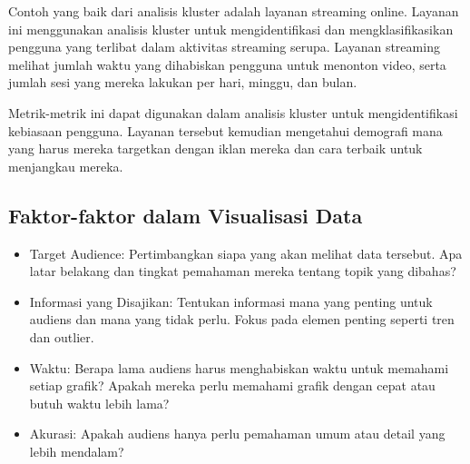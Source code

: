 \documentclass{article}
\begin{document}
\begin{itemize}
          Contoh yang baik dari analisis kluster adalah layanan streaming online. Layanan ini menggunakan analisis kluster untuk mengidentifikasi dan mengklasifikasikan pengguna yang terlibat dalam aktivitas streaming serupa. Layanan streaming melihat jumlah waktu yang dihabiskan pengguna untuk menonton video, serta jumlah sesi yang mereka lakukan per hari, minggu, dan bulan.

          Metrik-metrik ini dapat digunakan dalam analisis kluster untuk mengidentifikasi kebiasaan pengguna. Layanan tersebut kemudian mengetahui demografi mana yang harus mereka targetkan dengan iklan mereka dan cara terbaik untuk menjangkau mereka.

\end{itemize}

\subsection{Faktor-faktor dalam Visualisasi Data}
\begin{itemize}
    \item Target Audience: Pertimbangkan siapa yang akan melihat data tersebut. Apa latar belakang dan tingkat pemahaman mereka tentang topik yang dibahas?
    \item Informasi yang Disajikan: Tentukan informasi mana yang penting untuk audiens dan mana yang tidak perlu. Fokus pada elemen penting seperti tren dan outlier.
    \item Waktu: Berapa lama audiens harus menghabiskan waktu untuk memahami setiap grafik? Apakah mereka perlu memahami grafik dengan cepat atau butuh waktu lebih lama?
    \item Akurasi: Apakah audiens hanya perlu pemahaman umum atau detail yang lebih mendalam?
\end{itemize}
\end{document}
